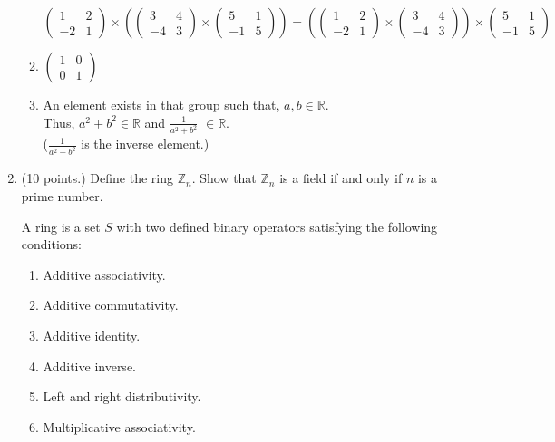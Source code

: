 \documentclass[12pt,fleqn]{article}
\begin{document}
\begin{enumerate}
\begin{enumerate}
$\begin{pmatrix} 
 1 & 2 \\
-2 & 1 
\end{pmatrix}\times (\begin{pmatrix} 
 3 & 4 \\
-4 & 3 
\end{pmatrix} \times \begin{pmatrix} 
 5 & 1 \\
-1 & 5 
\end{pmatrix}) = (\begin{pmatrix} 
 1 & 2 \\
-2 & 1 
\end{pmatrix}\times \begin{pmatrix} 
 3 & 4 \\
-4 & 3 
\end{pmatrix}) \times \begin{pmatrix} 
 5 & 1 \\
-1 & 5 
\end{pmatrix} $ 

\item
$\begin{pmatrix} 
 1 & 0 \\
 0 & 1 
\end{pmatrix} $

\item
An element exists in that group such that, $a,b \in \mathbb{R}.$ \\
Thus, $ a^2 + b^2 \in \mathbb{R} $ and $\frac{1}{a^2 + b^2 } $ $\in \mathbb{R}.$\\
($\frac{1}{a^2 + b^2 } $ is the inverse element.)



\end{enumerate}


\item (10 points.) Define the ring $\mathbb{Z}_n$. Show that $\mathbb{Z}_n$ is a field if and only if \(n\) is a prime number.

A ring is a set $S$ with two defined binary operators satisfying the following conditions:
\begin{enumerate}
\item Additive associativity.
\item Additive commutativity.
\item Additive identity.
\item Additive inverse.
\item Left and right distributivity.
\item Multiplicative associativity.
\end{enumerate}


\end{enumerate}
\end{document}
